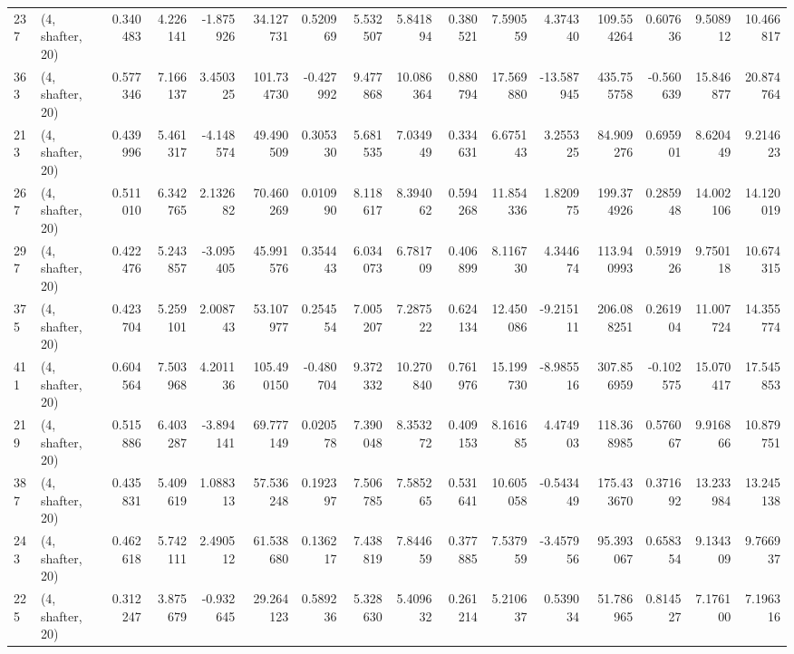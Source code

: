 \begin{tabular}{llrrrrrrrrrrrrrr}
237 &  (4, shafter, 20) &   0.340483 &   4.226141 &  -1.875926 &    34.127731 &   0.520969 &   5.532507 &   5.841894 &  0.380521 &   7.590559 &   4.374340 &   109.554264 &  0.607636 &   9.508912 &  10.466817 \\
363 &  (4, shafter, 20) &   0.577346 &   7.166137 &   3.450325 &   101.734730 &  -0.427992 &   9.477868 &  10.086364 &  0.880794 &  17.569880 & -13.587945 &   435.755758 & -0.560639 &  15.846877 &  20.874764 \\
213 &  (4, shafter, 20) &   0.439996 &   5.461317 &  -4.148574 &    49.490509 &   0.305330 &   5.681535 &   7.034949 &  0.334631 &   6.675143 &   3.255325 &    84.909276 &  0.695901 &   8.620449 &   9.214623 \\
267 &  (4, shafter, 20) &   0.511010 &   6.342765 &   2.132682 &    70.460269 &   0.010990 &   8.118617 &   8.394062 &  0.594268 &  11.854336 &   1.820975 &   199.374926 &  0.285948 &  14.002106 &  14.120019 \\
297 &  (4, shafter, 20) &   0.422476 &   5.243857 &  -3.095405 &    45.991576 &   0.354443 &   6.034073 &   6.781709 &  0.406899 &   8.116730 &   4.344674 &   113.940993 &  0.591926 &   9.750118 &  10.674315 \\
375 &  (4, shafter, 20) &   0.423704 &   5.259101 &   2.008743 &    53.107977 &   0.254554 &   7.005207 &   7.287522 &  0.624134 &  12.450086 &  -9.215111 &   206.088251 &  0.261904 &  11.007724 &  14.355774 \\
411 &  (4, shafter, 20) &   0.604564 &   7.503968 &   4.201136 &   105.490150 &  -0.480704 &   9.372332 &  10.270840 &  0.761976 &  15.199730 &  -8.985516 &   307.856959 & -0.102575 &  15.070417 &  17.545853 \\
219 &  (4, shafter, 20) &   0.515886 &   6.403287 &  -3.894141 &    69.777149 &   0.020578 &   7.390048 &   8.353272 &  0.409153 &   8.161685 &   4.474903 &   118.368985 &  0.576067 &   9.916866 &  10.879751 \\
387 &  (4, shafter, 20) &   0.435831 &   5.409619 &   1.088313 &    57.536248 &   0.192397 &   7.506785 &   7.585265 &  0.531641 &  10.605058 &  -0.543449 &   175.433670 &  0.371692 &  13.233984 &  13.245138 \\
243 &  (4, shafter, 20) &   0.462618 &   5.742111 &   2.490512 &    61.538680 &   0.136217 &   7.438819 &   7.844659 &  0.377885 &   7.537959 &  -3.457956 &    95.393067 &  0.658354 &   9.134309 &   9.766937 \\
225 &  (4, shafter, 20) &   0.312247 &   3.875679 &  -0.932645 &    29.264123 &   0.589236 &   5.328630 &   5.409632 &  0.261214 &   5.210637 &   0.539034 &    51.786965 &  0.814527 &   7.176100 &   7.196316 \\

\end{tabular}
